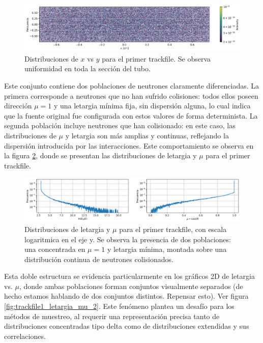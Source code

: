 \begin{figure}[h]
    \centering
    \includegraphics[width=\textwidth]{figs/fig2_2.png}
    \caption{Distribuciones de $x$ vs $y$ para el primer trackfile. Se observa uniformidad en toda la sección del tubo.}
    \label{fig:trackfile1_x_y}
\end{figure}

Este conjunto contiene dos poblaciones de neutrones claramente diferenciadas. La primera corresponde a neutrones que no han sufrido colisiones: todos ellos poseen dirección $\mu = 1$ y una letargia mínima fija, sin dispersión alguna, lo cual indica que la fuente original fue configurada con estos valores de forma determinista. La segunda población incluye neutrones que han colisionado: en este caso, las distribuciones de $\mu$ y letargia son más amplias y continuas, reflejando la dispersión introducida por las interacciones. Este comportamiento se observa en la figura \ref{fig:trackfile1_letargia_mu}, donde se presentan las distribuciones de letargia y $\mu$ para el primer trackfile. 

\begin{figure}[h]
    \centering
    \includegraphics[width=\textwidth]{figs/fig2_1.png}
    \caption{Distribuciones de letargia y $\mu$ para el primer trackfile, con escala logaritmica en el eje y. Se observa la presencia de dos poblaciones: una concentrada en $\mu = 1$ y letargia mínima, montada sobre una distribución continua de neutrones colisionados.}
    \label{fig:trackfile1_letargia_mu}
\end{figure}

Esta doble estructura se evidencia particularmente en los gráficos 2D de letargia vs. $\mu$, donde ambas poblaciones forman conjuntos visualmente separados (de hecho estamos hablando de dos conjuntos distintos. Repensar esto). Ver figura \ref{fig:trackfile1_letargia_mu_2}. Este fenómeno plantea un desafío para los métodos de muestreo, al requerir una representación precisa tanto de distribuciones concentradas tipo delta como de distribuciones extendidas y sus correlaciones.

